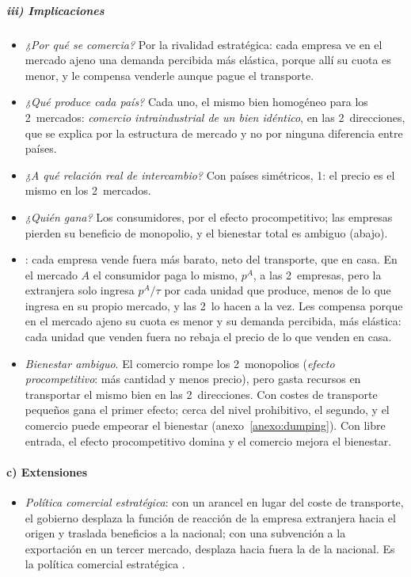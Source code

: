 \documentclass[11pt]{article}
\begin{document}
\subparagraph{iii) Implicaciones}

\begin{itemize}
\item \emph{¿Por qué se comercia?} Por la rivalidad estratégica: cada empresa ve en el mercado ajeno una demanda percibida más elástica, porque allí su cuota es menor, y le compensa venderle aunque pague el transporte.
\item \emph{¿Qué produce cada país?} Cada uno, el mismo bien homogéneo para los 2~mercados: \emph{comercio intraindustrial de un bien idéntico}, en las 2~direcciones, que se explica por la estructura de mercado y no por ninguna diferencia entre países.
\item \emph{¿A qué relación real de intercambio?} Con países simétricos, 1: el precio es el mismo en los 2~mercados.
\item \emph{¿Quién gana?} Los consumidores, por el efecto procompetitivo; las empresas pierden su beneficio de monopolio, y el bienestar total es ambiguo (abajo).
\item {}: cada empresa vende fuera más barato, neto del transporte, que en casa. En el mercado $A$ el consumidor paga lo mismo, $p^A$, a las 2~empresas, pero la extranjera solo ingresa $p^A/\tau$ por cada unidad que produce, menos de lo que ingresa en su propio mercado, y las 2~lo hacen a la vez. Les compensa porque en el mercado ajeno su cuota es menor y su demanda percibida, más elástica: cada unidad que venden fuera no rebaja el precio de lo que venden en casa.
\item \emph{Bienestar ambiguo}. El comercio rompe los 2~monopolios (\emph{efecto procompetitivo}: más cantidad y menos precio), pero gasta recursos en transportar el mismo bien en las 2~direcciones. Con costes de transporte pequeños gana el primer efecto; cerca del nivel prohibitivo, el segundo, y el comercio puede empeorar el bienestar (anexo~\ref{anexo:dumping}). Con libre entrada, el efecto procompetitivo domina y el comercio mejora el bienestar\nocite{BranderKrugman1983Reciprocal}.
\end{itemize}

\paragraph{c) Extensiones}

\begin{itemize}
\item \emph{Política comercial estratégica}: con un arancel en lugar del coste de transporte, el gobierno desplaza la función de reacción de la empresa extranjera hacia el origen y traslada beneficios a la nacional; con una subvención a la exportación en un tercer mercado, desplaza hacia fuera la de la nacional\nocite{BranderSpencer1985Export}. Es la política comercial estratégica .
\end{itemize}
\end{document}
